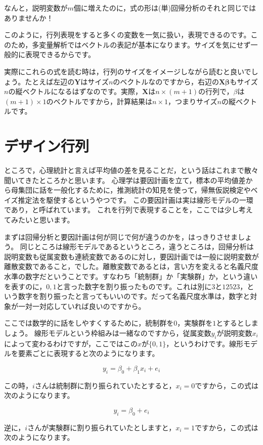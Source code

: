 \documentclass{ltjsbook}
\begin{document}
なんと，説明変数が$m$個に増えたのに，式の形は(単)回帰分析のそれと同じではありませんか！

このように，行列表現をすると多くの変数を一気に扱い，表現できるのです。このため，多変量解析ではベクトルの表記が基本になります。サイズを気にせず一般的に表現できるからです。

実際にこれらの式を読む時は，行列のサイズをイメージしながら読むと良いでしょう。たとえば左辺の$\bm{Y}$はサイズ$n$のベクトルなのですから，右辺の$\bm{X \beta}$もサイズ$n$の縦ベクトルになるはずなのです。実際，$\bm{X}$は$n \times (m+1)$の行列で，$\beta$は$(m+1) \times 1$のベクトルですから，計算結果は$n \times 1$，つまりサイズ$n$の縦ベクトルです。

\section{デザイン行列}
ところで，心理統計と言えば平均値の差を見ることだ，という話はこれまで散々聞いてきたところかと思います。
心理学は要因計画を立て，標本の平均値差から母集団に話を一般化するために，推測統計の知見を使って，帰無仮説検定やベイズ推定法を駆使するというやつです。
この要因計画は実は線形モデルの一環であり，と呼ばれています。
これを行列で表現することを，ここでは少し考えてみたいと思います。

まずは回帰分析と要因計画は何が同じで何が違うのかを，はっきりさせましょう。
同じところは線形モデルであるというところ，違うところは，回帰分析は説明変数も従属変数も連続変数であるのに対し，要因計画では一般に説明変数が離散変数であること，でした。離散変数であるとは，言い方を変えると名義尺度水準の数字だということです。すなわち「統制群」か「実験群」か，という違いを表すのに，$0,1$と言った数字を割り振ったものです。これは別に$3$と$12523$，という数字を割り振ったと言ってもいいのです。だって名義尺度水準は，数字と対象が一対一対応していれば良いのですから。

ここでは数学的に話をしやすくするために，統制群を$0$，実験群を$1$とするとしましょう。
線形モデルという枠組みは一緒なのですから，従属変数$y_i$が説明変数$x_i$によって変わるわけですが，ここではこの$x$が$ \{ 0, 1 \}$，というわけです。線形モデルを要素ごとに表現すると次のようになります。

\[ y_i = \beta_0 + \beta_1 x_i + e_i \]

この時，$i$さんは統制群に割り振られていたとすると，$x_i=0$ですから，この式は次のようになります。

\[ y_i = \beta_0 + e_i \]

逆に，$i$さんが実験群に割り振られていたとしますと，$x_i= 1$ですから，この式は次のようになります。
\end{document}
